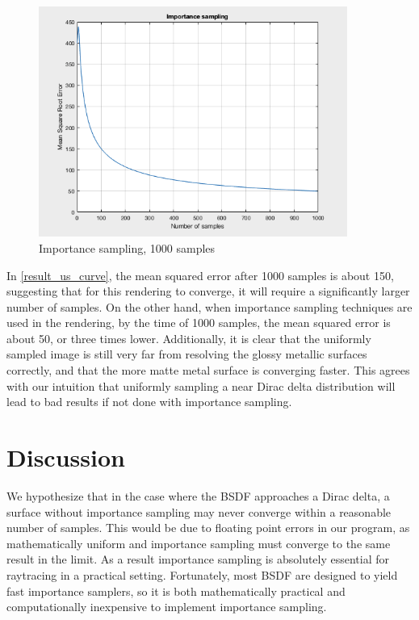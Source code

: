 \documentclass[12pt]{article}
\begin{document}
\begin{figure}[H]
  \centering
  \includegraphics[width=0.9\textwidth]{IS1000.png}
  \caption{Importance sampling, 1000 samples}
  \label{result_is_curve}
\end{figure}

In \cref{result_us_curve}, the mean squared error after 1000 samples is about 150, suggesting that for this rendering to converge, it will require a significantly larger number of samples.
On the other hand, when importance sampling techniques are used in the rendering, by the time of 1000 samples, the mean squared error is about 50, or three times lower.
Additionally, it is clear that the uniformly sampled image is still very far from resolving the glossy metallic surfaces correctly, and that the more matte metal surface is converging faster.
This agrees with our intuition that uniformly sampling a near Dirac delta distribution will lead to bad results if not done with importance sampling.

\section{Discussion}

We hypothesize that in the case where the BSDF approaches a Dirac delta, a surface without importance sampling may never converge within a reasonable number of samples.
This would be due to floating point errors in our program, as mathematically uniform and importance sampling must converge to the same result in the limit.
As a result importance sampling is absolutely essential for raytracing in a practical setting.
Fortunately, most BSDF are designed to yield fast importance samplers, so it is both mathematically practical and computationally inexpensive to implement importance sampling. 

\nocite{jiayin_2017}
\nocite{koenderink1996bidirectional}

\printbibliography
\end{document}
